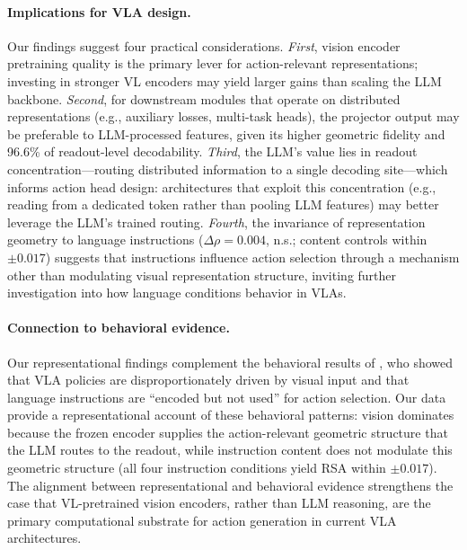 \paragraph{Implications for VLA design.}
Our findings suggest four practical considerations.
\emph{First}, vision encoder pretraining quality is the primary lever for action-relevant representations; investing in stronger VL encoders may yield larger gains than scaling the LLM backbone.
\emph{Second}, for downstream modules that operate on distributed representations (e.g., auxiliary losses, multi-task heads), the projector output may be preferable to LLM-processed features, given its higher geometric fidelity and 96.6\% of readout-level decodability.
\emph{Third}, the LLM's value lies in readout concentration---routing distributed information to a single decoding site---which informs action head design: architectures that exploit this concentration (e.g., reading from a dedicated token rather than pooling LLM features) may better leverage the LLM's trained routing.
\emph{Fourth}, the invariance of representation geometry to language instructions ($\Delta\rho = 0.004$, n.s.; content controls within $\pm 0.017$) suggests that instructions influence action selection through a mechanism other than modulating visual representation structure, inviting further investigation into how language conditions behavior in VLAs.

\paragraph{Connection to behavioral evidence.}
Our representational findings complement the behavioral results of \citet{grant2026}, who showed that VLA policies are disproportionately driven by visual input and that language instructions are ``encoded but not used'' for action selection.
Our data provide a representational account of these behavioral patterns: vision dominates because the frozen encoder supplies the action-relevant geometric structure that the LLM routes to the readout, while instruction content does not modulate this geometric structure (all four instruction conditions yield RSA within $\pm 0.017$).
The alignment between representational and behavioral evidence strengthens the case that VL-pretrained vision encoders, rather than LLM reasoning, are the primary computational substrate for action generation in current VLA architectures.

